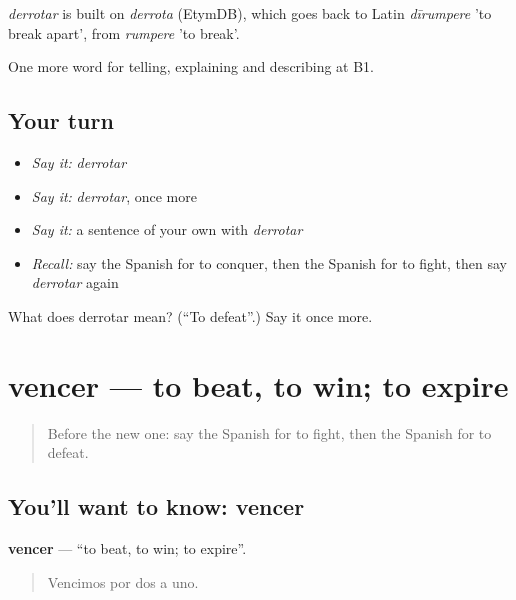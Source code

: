 \begin{cousinweb}
\emph{derrotar} is built on \emph{derrota} (EtymDB), which goes back to Latin \emph{dīrumpere} 'to break apart', from \emph{rumpere} 'to break'.
\end{cousinweb}

\begin{grammarlens}[title={What you've built}]
One more word for telling, explaining and describing at B1.
\end{grammarlens}

\subsection*{Your turn}
\begin{itemize}
\raggedright
  \item \emph{Say it:} \emph{derrotar}
  \item \emph{Say it:} \emph{derrotar}, once more
  \item \emph{Say it:} a sentence of your own with \emph{derrotar}
  \item \emph{Recall:} say the Spanish for to conquer, then the Spanish for to fight, then say \emph{derrotar} again
\end{itemize}

\begin{tcolorbox}[breakable,colback=teal!4,colframe=teal!35!black,title={Before you move on}]
What does derrotar mean? (\textquotedblleft{}To defeat\textquotedblright{}.) Say it once more.
\end{tcolorbox}
\section[vencer]{vencer — to beat, to win; to expire}

\label{lesson:ES-C569-vencer}



\begin{quote}
Before the new one: say the Spanish for to fight, then the Spanish for to defeat.
\end{quote}

\subsection*{You'll want to know: vencer}
\textbf{vencer} — \textquotedblleft{}to beat, to win; to expire\textquotedblright{}.

\begin{quote}
Vencimos por dos a uno.
\end{quote}


